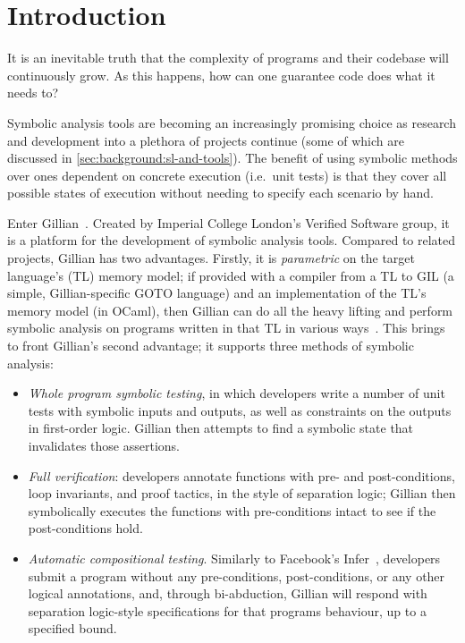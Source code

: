 
\chapter{Introduction}\label{sec:intro}

It is an inevitable truth that the complexity of programs and their codebase
will continuously grow. As this happens, how can one guarantee code does what
it needs to?

Symbolic analysis tools are becoming an increasingly promising choice as
research and development into a plethora of projects continue (some of which
are discussed in \autoref{sec:background:sl-and-tools}). The benefit of using
symbolic methods over ones dependent on concrete execution (i.e.\ unit tests) is
that they cover all possible states of execution without needing to specify each
scenario by hand.

Enter
Gillian~\cite{gillian-santos,gillian-part1,gillian-part2,gillian-techrep}.
Created by Imperial College London's Verified Software group, it
is a platform for the development of symbolic analysis tools. Compared to
related projects, Gillian has two advantages.
Firstly, it is \textit{parametric} on the target language's (TL) memory model;
if provided with a compiler from a TL to GIL (a simple, Gillian-specific
GOTO language) and an implementation of the TL's memory model (in OCaml),
then Gillian can do all the heavy lifting and perform symbolic analysis on programs written in that
TL in various ways~\cite{gillian-part1}. This brings to front Gillian's second advantage; it supports three methods of symbolic
analysis:
\begin{itemize}
  \item \emph{Whole program symbolic testing}, in which developers write a
  number of unit tests with symbolic inputs and outputs, as well as constraints
  on the outputs in first-order logic. Gillian then attempts to find a symbolic
  state that invalidates those assertions.

  \item \emph{Full verification}: developers annotate functions with pre- and
  post-conditions, loop invariants, and proof tactics, in the style of
  separation logic; Gillian then symbolically executes the functions with
  pre-conditions intact to see if the post-conditions hold.

  \item \emph{Automatic compositional testing}. Similarly to Facebook's
  Infer~\cite{infer, infer-site}, developers submit a program without any
  pre-conditions, post-conditions, or any other logical annotations, and,
  through bi-abduction\cite{bi-abduction}, Gillian will respond with
  separation logic-style specifications for that programs behaviour, up
  to a specified bound.
\end{itemize}

